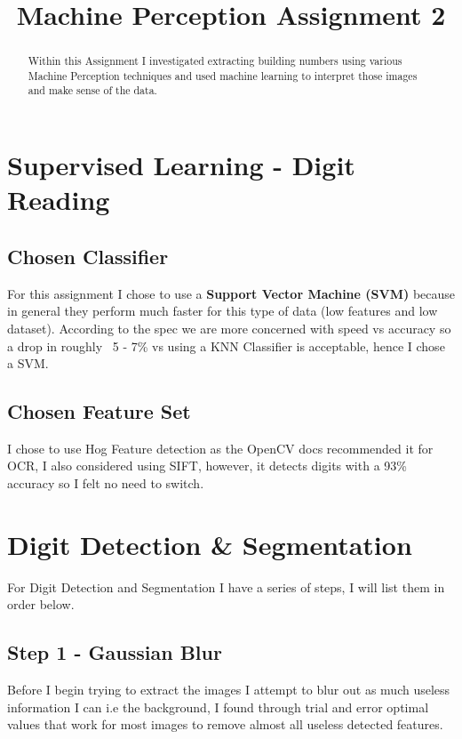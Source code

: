 \documentclass[conference]{IEEEtran}
\begin{document}
\title{Machine Perception Assignment 2}

\author{
}

\maketitle

\begin{abstract}
Within this Assignment I investigated extracting building numbers using various Machine Perception techniques and used
machine learning to interpret those images and make sense of the data.
\end{abstract}

\section{Supervised Learning - Digit Reading}
\subsection{Chosen Classifier}
For this assignment I chose to use a \textbf{Support Vector Machine (SVM)} because in general they perform much faster for this
type of data (low features and low dataset). According to the spec we are more concerned with speed vs accuracy so a drop in
roughly ~5 - 7\% vs using a KNN Classifier is acceptable, hence I chose a SVM.
\subsection{Chosen Feature Set}
I chose to use Hog Feature detection as the OpenCV docs recommended it for OCR, I also considered using SIFT, however, it detects
digits with a 93\% accuracy so I felt no need to switch.

\section{Digit Detection \& Segmentation}
For Digit Detection and Segmentation I have a series of steps, I will list them in order below.
\subsection{Step 1 - Gaussian Blur}
Before I begin trying to extract the images I attempt to blur out as much useless information I can i.e the background,
I found through trial and error optimal values that work for most images to remove almost all useless detected features.
\end{document}
